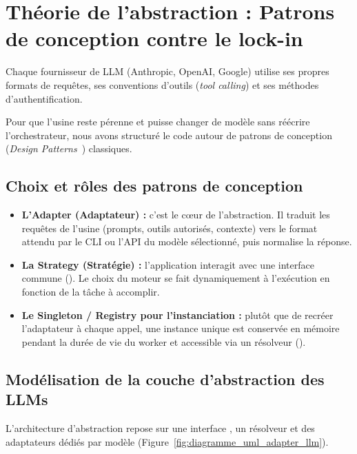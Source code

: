 \documentclass{tnreport}
\begin{document}
\section{Théorie de l'abstraction : Patrons de conception contre le lock-in}
\label{sec:theorie_abstraction}

Chaque fournisseur de LLM (Anthropic, OpenAI, Google) utilise ses propres formats de requêtes, ses conventions d'outils (\textit{tool calling}) et ses méthodes d'authentification.

Pour que l'usine reste pérenne et puisse changer de modèle sans réécrire l'orchestrateur, nous avons structuré le code autour de patrons de conception (\textit{Design Patterns}~\cite{gamma1994design}) classiques.

\subsection{Choix et rôles des patrons de conception}
\label{subsec:arbitrage_patterns}

\begin{itemize}
    \item \textbf{L'Adapter (Adaptateur) :} c'est le cœur de l'abstraction. Il traduit les requêtes de l'usine (prompts, outils autorisés, contexte) vers le format attendu par le CLI ou l'API du modèle sélectionné, puis normalise la réponse.
    \item \textbf{La Strategy (Stratégie) :} l'application interagit avec une interface commune (). Le choix du moteur se fait dynamiquement à l'exécution en fonction de la tâche à accomplir.
    \item \textbf{Le Singleton / Registry pour l'instanciation :} plutôt que de recréer l'adaptateur à chaque appel, une instance unique est conservée en mémoire pendant la durée de vie du worker et accessible via un résolveur ().
\end{itemize}

\subsection{Modélisation de la couche d'abstraction des LLMs}
\label{subsec:modelisation_abstraction_llm}

L'architecture d'abstraction repose sur une interface , un résolveur et des adaptateurs dédiés par modèle (Figure~\ref{fig:diagramme_uml_adapter_llm}).
\end{document}

